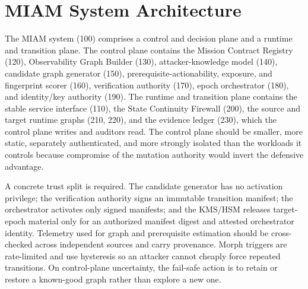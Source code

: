 \documentclass[11pt,letterpaper]{article}
\begin{document}
\section{MIAM System Architecture}

The MIAM system (100) comprises a control and decision plane and a runtime and transition plane. The control plane contains the Mission Contract Registry (120), Observability Graph Builder (130), attacker-knowledge model (140), candidate graph generator (150), prerequisite-actionability, exposure, and fingerprint scorer (160), verification authority (170), epoch orchestrator (180), and identity/key authority (190). The runtime and transition plane contains the stable service interface (110), the State Continuity Firewall (200), the source and target runtime graphs (210, 220), and the evidence ledger (230), which the control plane writes and auditors read. The control plane should be smaller, more static, separately authenticated, and more strongly isolated than the workloads it controls because compromise of the mutation authority would invert the defensive advantage.

A concrete trust split is required. The candidate generator has no activation privilege; the verification authority signs an immutable transition manifest; the orchestrator activates only signed manifests; and the KMS/HSM releases target-epoch material only for an authorized manifest digest and attested orchestrator identity. Telemetry used for graph and prerequisite estimation should be cross-checked across independent sources and carry provenance. Morph triggers are rate-limited and use hysteresis so an attacker cannot cheaply force repeated transitions. On control-plane uncertainty, the fail-safe action is to retain or restore a known-good graph rather than explore a new one.
\end{document}
